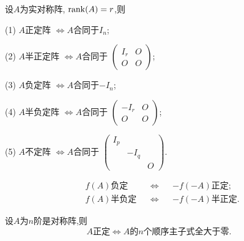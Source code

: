 \begin{theorem}\label{thm:PN2}
  设$A$为实对称阵, $\operatorname{rank}(A)=r$,则

  (1) $A$正定阵 $\Leftrightarrow A$合同于$I_n$;

  (2) $A$半正定阵 $\Longleftrightarrow A$合同于
  $\left(\begin{smallmatrix}
    I_r&O\\O&O
  \end{smallmatrix}\right)$;

(3) $A$负定阵 $\Longleftrightarrow A$合同于$-I_n$;

(4) $A$半负定阵 $\Longleftrightarrow A$合同于
  $\left(\begin{smallmatrix}
    -I_r&O\\O&O
  \end{smallmatrix}\right)$;

(5) $A$不定阵 $\Longleftrightarrow A$合同于
  $\left(\begin{smallmatrix}
    I_p&&\\&-I_q&\\&&O
  \end{smallmatrix}\right)$.
\end{theorem}

\begin{remark}
  \begin{align*}
    & f(A)  \text{负定} && \Longleftrightarrow && -f(-A) \text{正定};\\
    & f(A)  \text{半负定} && \Longleftrightarrow && -f(-A) \text{半正定}.
  \end{align*}
\end{remark}

\begin{theorem}\label{thm:PN3}
  设$A$为$n$阶是对称阵,则
  \[ A\text{正定} \Longleftrightarrow A \text{的$n$个顺序主子式全大于零}. \]
\end{theorem}

